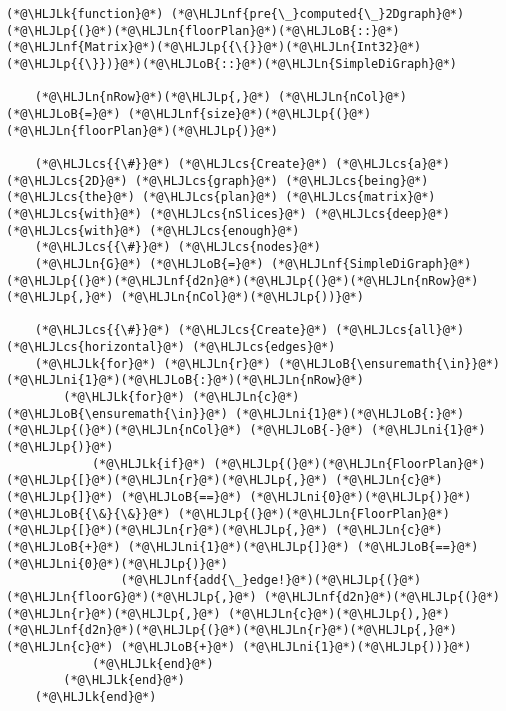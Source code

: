 \documentclass[12pt,a4paper]{article}
\newcommand{\HLJLk}[1]{\textcolor[RGB]{148,91,176}{\textbf{#1}}}
\newcommand{\HLJLn}[1]{#1}
\newcommand{\HLJLnf}[1]{\textcolor[RGB]{66,102,213}{#1}}
\newcommand{\HLJLni}[1]{\textcolor[RGB]{59,151,46}{#1}}
\newcommand{\HLJLoB}[1]{\textcolor[RGB]{102,102,102}{\textbf{#1}}}
\newcommand{\HLJLp}[1]{#1}
\newcommand{\HLJLcs}[1]{\textcolor[RGB]{153,153,119}{\textit{#1}}}
\begin{document}
\begin{lstlisting}
(*@\HLJLk{function}@*) (*@\HLJLnf{pre{\_}computed{\_}2Dgraph}@*)(*@\HLJLp{(}@*)(*@\HLJLn{floorPlan}@*)(*@\HLJLoB{::}@*)(*@\HLJLnf{Matrix}@*)(*@\HLJLp{{\{}}@*)(*@\HLJLn{Int32}@*)(*@\HLJLp{{\}})}@*)(*@\HLJLoB{::}@*)(*@\HLJLn{SimpleDiGraph}@*)

    (*@\HLJLn{nRow}@*)(*@\HLJLp{,}@*) (*@\HLJLn{nCol}@*) (*@\HLJLoB{=}@*) (*@\HLJLnf{size}@*)(*@\HLJLp{(}@*)(*@\HLJLn{floorPlan}@*)(*@\HLJLp{)}@*)

    (*@\HLJLcs{{\#}}@*) (*@\HLJLcs{Create}@*) (*@\HLJLcs{a}@*) (*@\HLJLcs{2D}@*) (*@\HLJLcs{graph}@*) (*@\HLJLcs{being}@*) (*@\HLJLcs{the}@*) (*@\HLJLcs{plan}@*) (*@\HLJLcs{matrix}@*) (*@\HLJLcs{with}@*) (*@\HLJLcs{nSlices}@*) (*@\HLJLcs{deep}@*) (*@\HLJLcs{with}@*) (*@\HLJLcs{enough}@*)
    (*@\HLJLcs{{\#}}@*) (*@\HLJLcs{nodes}@*)
    (*@\HLJLn{G}@*) (*@\HLJLoB{=}@*) (*@\HLJLnf{SimpleDiGraph}@*)(*@\HLJLp{(}@*)(*@\HLJLnf{d2n}@*)(*@\HLJLp{(}@*)(*@\HLJLn{nRow}@*)(*@\HLJLp{,}@*) (*@\HLJLn{nCol}@*)(*@\HLJLp{))}@*)

    (*@\HLJLcs{{\#}}@*) (*@\HLJLcs{Create}@*) (*@\HLJLcs{all}@*) (*@\HLJLcs{horizontal}@*) (*@\HLJLcs{edges}@*)
    (*@\HLJLk{for}@*) (*@\HLJLn{r}@*) (*@\HLJLoB{\ensuremath{\in}}@*) (*@\HLJLni{1}@*)(*@\HLJLoB{:}@*)(*@\HLJLn{nRow}@*)
        (*@\HLJLk{for}@*) (*@\HLJLn{c}@*) (*@\HLJLoB{\ensuremath{\in}}@*) (*@\HLJLni{1}@*)(*@\HLJLoB{:}@*)(*@\HLJLp{(}@*)(*@\HLJLn{nCol}@*) (*@\HLJLoB{-}@*) (*@\HLJLni{1}@*)(*@\HLJLp{)}@*)
            (*@\HLJLk{if}@*) (*@\HLJLp{(}@*)(*@\HLJLn{FloorPlan}@*)(*@\HLJLp{[}@*)(*@\HLJLn{r}@*)(*@\HLJLp{,}@*) (*@\HLJLn{c}@*)(*@\HLJLp{]}@*) (*@\HLJLoB{==}@*) (*@\HLJLni{0}@*)(*@\HLJLp{)}@*) (*@\HLJLoB{{\&}{\&}}@*) (*@\HLJLp{(}@*)(*@\HLJLn{FloorPlan}@*)(*@\HLJLp{[}@*)(*@\HLJLn{r}@*)(*@\HLJLp{,}@*) (*@\HLJLn{c}@*) (*@\HLJLoB{+}@*) (*@\HLJLni{1}@*)(*@\HLJLp{]}@*) (*@\HLJLoB{==}@*) (*@\HLJLni{0}@*)(*@\HLJLp{)}@*)
                (*@\HLJLnf{add{\_}edge!}@*)(*@\HLJLp{(}@*)(*@\HLJLn{floorG}@*)(*@\HLJLp{,}@*) (*@\HLJLnf{d2n}@*)(*@\HLJLp{(}@*)(*@\HLJLn{r}@*)(*@\HLJLp{,}@*) (*@\HLJLn{c}@*)(*@\HLJLp{),}@*) (*@\HLJLnf{d2n}@*)(*@\HLJLp{(}@*)(*@\HLJLn{r}@*)(*@\HLJLp{,}@*) (*@\HLJLn{c}@*) (*@\HLJLoB{+}@*) (*@\HLJLni{1}@*)(*@\HLJLp{))}@*)
            (*@\HLJLk{end}@*)
        (*@\HLJLk{end}@*)
    (*@\HLJLk{end}@*)


\end{lstlisting}
\end{document}
